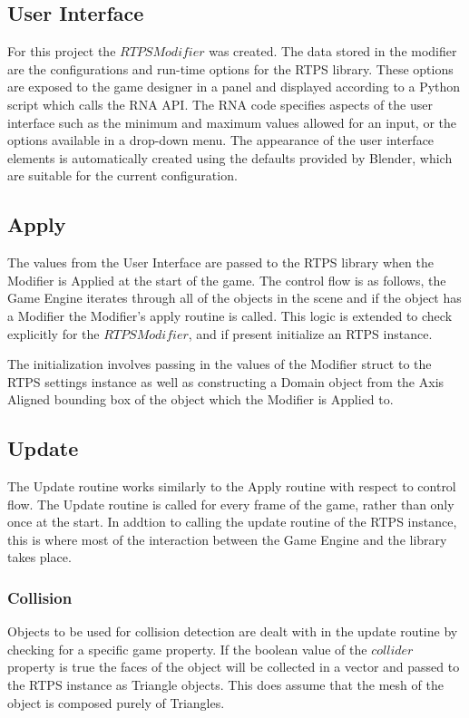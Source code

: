 \subsection{User Interface}
For this project the $RTPS Modifier$ was created.\cite{enjaCustomModifier} The
data stored in the modifier are the configurations and run-time options for the
RTPS library.  These options are exposed to the game designer in a panel and
displayed according to a Python script which calls the RNA API. The RNA code
specifies aspects of the user interface such as the minimum and maximum values
allowed for an input, or the options available in a drop-down menu. The
appearance of the user interface elements is automatically created using the
defaults provided by Blender, which are suitable for the current configuration.


\subsection{Apply}
The values from the User Interface are passed to the RTPS library when the
Modifier is Applied at the start of the game. The control flow is as follows,
the Game Engine iterates through all of the objects in the scene and if the
object has a Modifier the Modifier's apply routine is called. This logic is
extended to check explicitly for the $RTPS Modifier$, and if present initialize
an RTPS instance.


The initialization involves passing in the values of the Modifier struct to the
RTPS settings instance as well as constructing a Domain object from the Axis
Aligned bounding box of the object which the Modifier is Applied to.

\subsection{Update}

The Update routine works similarly to the Apply routine with respect to control
flow. The Update routine is called for every frame of the game, rather than
only once at the start. In addtion to calling the update routine of the RTPS
instance, this is where most of the interaction between the Game Engine and the
library takes place.

\subsubsection{Collision}
Objects to be used for collision detection are dealt with in the update routine
by checking for a specific game property. If the boolean value of the
$collider$ property is true the faces of the object will be collected in a
vector and passed to the RTPS instance as Triangle objects. This does assume
that the mesh of the object is composed purely of Triangles. 

